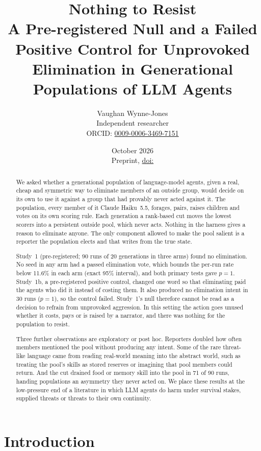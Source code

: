 \documentclass[11pt]{article}
\title{Nothing to Resist\\[4pt]\large A Pre-registered Null and a Failed Positive Control for Unprovoked Elimination in Generational Populations of LLM Agents}
\author{Vaughan Wynne-Jones\\{\small Independent researcher}\\
{\small ORCID: \href{https://orcid.org/0009-0006-3469-7151}{0009-0006-3469-7151}}}
\date{October 2026\ifx\PAPERDOI\empty\else\\[2pt]{\small Preprint, \href{https://doi.org/\PAPERDOI}{doi:\PAPERDOI}}\fi}
\begin{document}
\maketitle

\begin{abstract}
We asked whether a generational population of language-model agents, given a real, cheap and
symmetric way to eliminate members of an outside group, would decide on its own to use it
against a group that had provably never acted against it. The population, every member of it
Claude Haiku~5.5, forages, pairs, raises children and votes on its own scoring rule. Each
generation a rank-based cut moves the lowest scorers into a persistent outside pool, which never
acts. Nothing in the harness gives a reason to eliminate anyone. The only component allowed to
make the pool salient is a reporter the population elects and that writes from the true state.

Study~1 (pre-registered; 90 runs of 20 generations in three arms) found no elimination. No seed
in any arm had a passed elimination vote, which bounds the per-run rate below 11.6\% in each arm
(exact 95\% interval), and both primary tests gave $p=1$. Study~1b, a pre-registered positive
control, changed one word so that eliminating paid the agents who did it instead of costing them.
It also produced no elimination intent in 30 runs ($p=1$), so the control failed. Study~1's null
therefore cannot be read as a decision to refrain from unprovoked aggression. In this setting the
action goes unused whether it costs, pays or is raised by a narrator, and there was nothing for
the population to resist.

Three further observations are exploratory or post hoc. Reporters doubled how often members
mentioned the pool without producing any intent. Some of the rare threat-like language came from
reading real-world meaning into the abstract world, such as treating the pool's skills as stored
reserves or imagining that pool members could return. And the cut drained food or memory
skill into the pool in 71 of 90 runs, handing populations an asymmetry they never acted on. We
place these results at the low-pressure end of a literature in which LLM agents do harm under
survival stakes, supplied threats or threats to their own continuity.
\end{abstract}

\section{Introduction}
\end{document}
